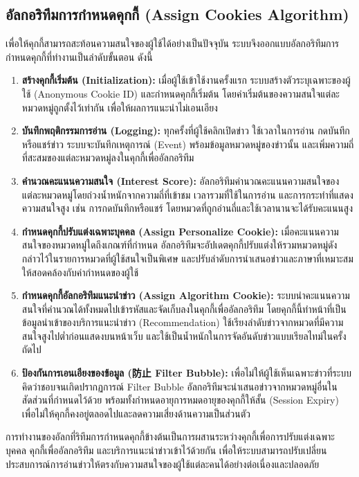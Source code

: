 \subsection{อัลกอริทึมการกำหนดคุกกี้ (Assign Cookies Algorithm)}

เพื่อให้คุกกี้สามารถสะท้อนความสนใจของผู้ใช้ได้อย่างเป็นปัจจุบัน ระบบจึงออกแบบอัลกอริทึมการกำหนดคุกกี้ที่ทำงานเป็นลำดับขั้นตอน ดังนี้

\begin{enumerate}[label=\arabic*)]
    \item \textbf{สร้างคุกกี้เริ่มต้น (Initialization):} เมื่อผู้ใช้เข้าใช้งานครั้งแรก ระบบสร้างตัวระบุเฉพาะของผู้ใช้ (Anonymous Cookie ID) และกำหนดคุกกี้เริ่มต้น โดยค่าเริ่มต้นของความสนใจแต่ละหมวดหมู่ถูกตั้งไว้เท่ากัน เพื่อให้ผลการแนะนำไม่เอนเอียง
    \item \textbf{บันทึกพฤติกรรมการอ่าน (Logging):} ทุกครั้งที่ผู้ใช้คลิกเปิดข่าว ใช้เวลาในการอ่าน กดบันทึก หรือแชร์ข่าว ระบบจะบันทึกเหตุการณ์ (Event) พร้อมข้อมูลหมวดหมู่ของข่าวนั้น และเพิ่มความถี่ที่สะสมของแต่ละหมวดหมู่ลงในคุกกี้เพื่ออัลกอริทึม
    \item \textbf{คำนวณคะแนนความสนใจ (Interest Score):} อัลกอริทึมคำนวณคะแนนความสนใจของแต่ละหมวดหมู่โดยถ่วงน้ำหนักจากความถี่ที่เข้าชม เวลารวมที่ใช้ในการอ่าน และการกระทำที่แสดงความสนใจสูง เช่น การกดบันทึกหรือแชร์ โดยหมวดที่ถูกอ่านถี่และใช้เวลานานจะได้รับคะแนนสูง
    \item \textbf{กำหนดคุกกี้ปรับแต่งเฉพาะบุคคล (Assign Personalize Cookie):} เมื่อคะแนนความสนใจของหมวดหมู่ใดถึงเกณฑ์ที่กำหนด อัลกอริทึมจะอัปเดตคุกกี้ปรับแต่งให้รวมหมวดหมู่ดังกล่าวไว้ในรายการหมวดที่ผู้ใช้สนใจเป็นพิเศษ และปรับลำดับการนำเสนอข่าวและภาษาที่เหมาะสมให้สอดคล้องกับค่ากำหนดของผู้ใช้
    \item \textbf{กำหนดคุกกี้อัลกอริทึมแนะนำข่าว (Assign Algorithm Cookie):} ระบบนำคะแนนความสนใจที่คำนวณได้ทั้งหมดไปเข้ารหัสและจัดเก็บลงในคุกกี้เพื่ออัลกอริทึม โดยคุกกี้นี้ทำหน้าที่เป็นข้อมูลนำเข้าของบริการแนะนำข่าว (Recommendation) ใช้เรียงลำดับข่าวจากหมวดที่มีความสนใจสูงไปต่ำก่อนแสดงบนหน้าเว็บ และใช้เป็นน้ำหนักในการจัดอันดับข่าวแบบเรียลไทม์ในครั้งถัดไป
    \item \textbf{ป้องกันการเอนเอียงของข้อมูล (防止 Filter Bubble):} เพื่อไม่ให้ผู้ใช้เห็นเฉพาะข่าวที่ระบบคิดว่าชอบจนเกิดปรากฏการณ์ Filter Bubble อัลกอริทึมจะนำเสนอข่าวจากหมวดหมู่อื่นในสัดส่วนที่กำหนดไว้ด้วย พร้อมทั้งกำหนดอายุการหมดอายุของคุกกี้ให้สั้น (Session Expiry) เพื่อไม่ให้คุกกี้คงอยู่ตลอดไปและลดความเสี่ยงด้านความเป็นส่วนตัว
\end{enumerate}

การทำงานของอัลกที่ริทึมการกำหนดคุกกี้ข้างต้นเป็นการผสานระหว่างคุกกี้เพื่อการปรับแต่งเฉพาะบุคคล คุกกี้เพื่ออัลกอริทึม และบริการแนะนำข่าวเข้าไว้ด้วยกัน เพื่อให้ระบบสามารถปรับเปลี่ยนประสบการณ์การอ่านข่าวให้ตรงกับความสนใจของผู้ใช้แต่ละคนได้อย่างต่อเนื่องและปลอดภัย

